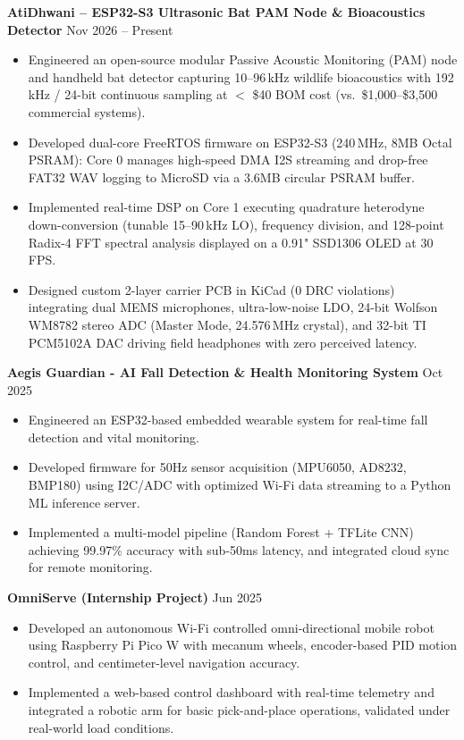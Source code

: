 \documentclass[10pt,a4paper]{article}%
\begin{document}
\noindent \textbf{AtiDhwani -- ESP32-S3 Ultrasonic Bat PAM Node \& Bioacoustics Detector} \hfill Nov 2026 -- Present%
\begin{itemize}[leftmargin=15pt, nosep, topsep=0pt]%
\item Engineered an open-source modular Passive Acoustic Monitoring (PAM) node and handheld bat detector capturing 10--96\,kHz wildlife bioacoustics with 192\,kHz / 24-bit continuous sampling at $<$ \$40 BOM cost (vs.\ \$1,000--\$3,500 commercial systems).%
\item Developed dual-core FreeRTOS firmware on ESP32-S3 (240\,MHz, 8MB Octal PSRAM): Core 0 manages high-speed DMA I2S streaming and drop-free FAT32 WAV logging to MicroSD via a 3.6MB circular PSRAM buffer.%
\item Implemented real-time DSP on Core 1 executing quadrature heterodyne down-conversion (tunable 15--90\,kHz LO), frequency division, and 128-point Radix-4 FFT spectral analysis displayed on a 0.91" SSD1306 OLED at 30\,FPS.%
\item Designed custom 2-layer carrier PCB in KiCad (0 DRC violations) integrating dual MEMS microphones, ultra-low-noise LDO, 24-bit Wolfson WM8782 stereo ADC (Master Mode, 24.576\,MHz crystal), and 32-bit TI PCM5102A DAC driving field headphones with zero perceived latency.%
\end{itemize} \vspace{8pt}

\noindent \textbf{Aegis Guardian - AI Fall Detection \& Health Monitoring System} \hfill Oct 2025%
\begin{itemize}[leftmargin=15pt, nosep, topsep=0pt]%
\item Engineered an ESP32-based embedded wearable system for real-time fall detection and vital monitoring.%
\item Developed firmware for 50Hz sensor acquisition (MPU6050, AD8232, BMP180) using I2C/ADC with optimized Wi-Fi data streaming to a Python ML inference server.%
\item Implemented a multi-model pipeline (Random Forest + TFLite CNN) achieving 99.97\% accuracy with sub-50ms latency, and integrated cloud sync for remote monitoring.%
\end{itemize} \vspace{8pt}

\noindent \textbf{OmniServe (Internship Project)} \hfill Jun 2025%
\begin{itemize}[leftmargin=15pt, nosep, topsep=0pt]%
\item Developed an autonomous Wi-Fi controlled omni-directional mobile robot using Raspberry Pi Pico W with mecanum wheels, encoder-based PID motion control, and centimeter-level navigation accuracy.%
\item Implemented a web-based control dashboard with real-time telemetry and integrated a robotic arm for basic pick-and-place operations, validated under real-world load conditions.%
\end{itemize} \vspace{8pt}
\end{document}
